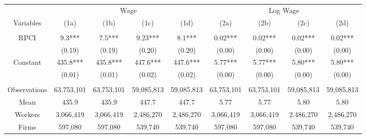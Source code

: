 \begin{tabular}{c|cccc|cccc}
\toprule
\toprule
      & \multicolumn{4}{c|}{Wage}     & \multicolumn{4}{c}{Log Wage} \\
Variables & (1a)  & (1b)  & (1c)  & (1d)  & (2a)  & (2b)  & (2c)  & (2d) \\
\midrule
      &       &       &       &       &       &       &       &  \\
RPCI  & 9.3*** & 7.5*** & 9.23*** & 8.1*** & 0.02*** & 0.02*** & 0.02*** & 0.02*** \\
      & (0.19) & (0.19) & (0.20) & (0.20) & (0.00) & (0.00) & (0.00) & (0.00) \\
Constant & 435.8*** & 435.8*** & 447.6*** & 447.6*** & 5.77*** & 5.77*** & 5.80*** & 5.80*** \\
      & (0.01) & (0.01) & (0.02) & (0.02) & (0.00) & (0.00) & (0.00) & (0.00) \\
      &       &       &       &       &       &       &       &  \\
\midrule
Observations & 63,753,101 & 63,753,101 & 59,085,813 & 59,085,813 & 63,753,101 & 63,753,101 & 59,085,813 & 59,085,813 \\
Mean  & 435.9 & 435.9 & 447.7 & 447.7 & 5.77  & 5.77  & 5.80  & 5.80 \\
Workers & 3,066,419 & 3,066,419 & 2,486,270 & 2,486,270 & 3,066,419 & 3,066,419 & 2,486,270 & 2,486,270 \\
Firms & 597,080 & 597,080 & 539,740 & 539,740 & 597,080 & 597,080 & 539,740 & 539,740 \\
\bottomrule
\bottomrule
\end{tabular}%
